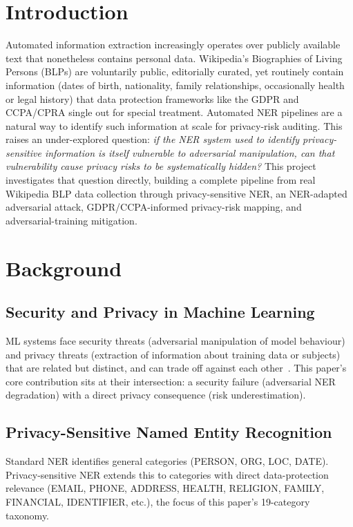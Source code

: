 \documentclass[conference]{IEEEtran}
\begin{document}
\section{Introduction}
Automated information extraction increasingly operates over publicly available text that nonetheless contains personal data. Wikipedia's Biographies of Living Persons (BLPs) are voluntarily public, editorially curated, yet routinely contain information (dates of birth, nationality, family relationships, occasionally health or legal history) that data protection frameworks like the GDPR and CCPA/CPRA single out for special treatment. Automated NER pipelines are a natural way to identify such information at scale for privacy-risk auditing. This raises an under-explored question: \emph{if the NER system used to identify privacy-sensitive information is itself vulnerable to adversarial manipulation, can that vulnerability cause privacy risks to be systematically hidden?} This project investigates that question directly, building a complete pipeline from real Wikipedia BLP data collection through privacy-sensitive NER, an NER-adapted adversarial attack, GDPR/CCPA-informed privacy-risk mapping, and adversarial-training mitigation.

\section{Background}

\subsection{Security and Privacy in Machine Learning}
ML systems face security threats (adversarial manipulation of model behaviour) and privacy threats (extraction of information about training data or subjects) that are related but distinct, and can trade off against each other~\cite{shokri2017membership}. This paper's core contribution sits at their intersection: a security failure (adversarial NER degradation) with a direct privacy consequence (risk underestimation).

\subsection{Privacy-Sensitive Named Entity Recognition}
Standard NER identifies general categories (PERSON, ORG, LOC, DATE). Privacy-sensitive NER extends this to categories with direct data-protection relevance (EMAIL, PHONE, ADDRESS, HEALTH, RELIGION, FAMILY, FINANCIAL, IDENTIFIER, etc.), the focus of this paper's 19-category taxonomy.
\end{document}
